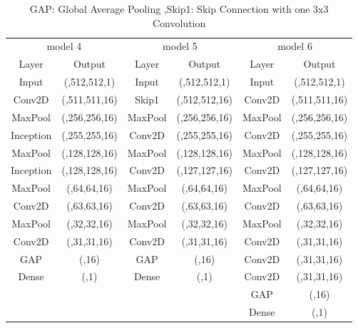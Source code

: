 \documentclass[
a4paper, 
12pt,
grayscalebody, %
abstract=on,
twoside, BCOR10mm, 12pt, DIV13,headinclude, footexclude, final, abstracton, openright
]{ibireprt}
\numberwithin{equation}{chapter}
\numberwithin{table}{chapter}
\numberwithin{figure}{chapter}
\numberwithin{algorithm}{chapter}
\numberwithin{example}{chapter}
\numberwithin{example}{chapter}
\begin{document}
\begin{table}
\begin{tabular}{cccccc}
	\toprule
	\multicolumn{2}{c}{model 4} &\multicolumn{2}{c}{model 5} & \multicolumn{2}{c}{model 6} \\ 
	Layer & Output &Layer & Output &Layer & Output\\
	\cmidrule(l){1-2} \cmidrule(l){3-4}\cmidrule(l){5-6}
	Input&(,512,512,1)&Input&(,512,512,1)&Input&(,512,512,1)\\
	\cmidrule(l){1-2} \cmidrule(l){3-4}\cmidrule(l){5-6}
	Conv2D& (,511,511,16) &Skip1	& (,512,512,16)&Conv2D	& (,511,511,16)\\
	\cmidrule(l){1-2} \cmidrule(l){3-4}\cmidrule(l){5-6}
	MaxPool&(,256,256,16)&MaxPool&(,256,256,16)&MaxPool&(,256,256,16)\\
	\cmidrule(l){1-2} \cmidrule(l){3-4}\cmidrule(l){5-6}
	Inception&(,255,255,16)&Conv2D&(,255,255,16)&Conv2D&(,255,255,16)\\
	\cmidrule(l){1-2} \cmidrule(l){3-4}\cmidrule(l){5-6}
	MaxPool&(,128,128,16)&MaxPool&(,128,128,16)&MaxPool&(,128,128,16)\\
	\cmidrule(l){1-2} \cmidrule(l){3-4}\cmidrule(l){5-6}
	Inception&(,128,128,16)&Conv2D&(,127,127,16)&Conv2D&(,127,127,16)\\
	\cmidrule(l){1-2} \cmidrule(l){3-4}\cmidrule(l){5-6}
	MaxPool&(,64,64,16)&MaxPool&(,64,64,16)&MaxPool&(,64,64,16)\\
	\cmidrule(l){1-2} \cmidrule(l){3-4}\cmidrule(l){5-6}
	Conv2D&(,63,63,16)&Conv2D&(,63,63,16)&Conv2D&(,63,63,16)\\
	\cmidrule(l){1-2} \cmidrule(l){3-4}\cmidrule(l){5-6}
	MaxPool&(,32,32,16)&MaxPool&(,32,32,16)&MaxPool&(,32,32,16)\\
	\cmidrule(l){1-2} \cmidrule(l){3-4}\cmidrule(l){5-6}
	Conv2D&(,31,31,16)&Conv2D&(,31,31,16)&Conv2D&(,31,31,16)\\
	\cmidrule(l){1-2} \cmidrule(l){3-4}\cmidrule(l){5-6}
	GAP&(,16)&GAP&(,16)&Conv2D&(,31,31,16)\\
	\cmidrule(l){1-2} \cmidrule(l){3-4}\cmidrule(l){5-6}
	Dense&(,1)&Dense&(,1)&Conv2D&(,31,31,16)\\
	\cmidrule(l){5-6}
	&&&&GAP&(,16)\\
	\cmidrule(l){5-6}
	&&&&Dense&(,1)\\
\end{tabular}


\caption{GAP: Global Average Pooling ,Skip1: Skip Connection with one 3x3 Convolution}
\label{table:tab1}
\end{table}
\end{document}
